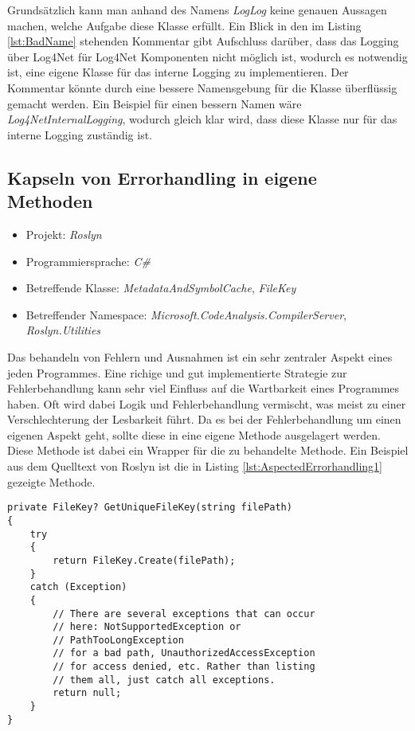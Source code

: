 \SuperPar Grundsätzlich kann man anhand des Namens \textit{LogLog} keine genauen Aussagen machen, welche Aufgabe diese Klasse erfüllt. Ein Blick in den im Listing \ref{lst:BadName} stehenden Kommentar gibt Aufschluss darüber, dass das Logging über Log4Net für Log4Net Komponenten nicht möglich ist, wodurch es notwendig ist, eine eigene Klasse für das interne Logging zu implementieren. Der Kommentar könnte durch eine bessere Namensgebung für die Klasse überflüssig gemacht werden. Ein Beispiel für einen bessern Namen wäre \textit{Log4NetInternalLogging}, wodurch gleich klar wird, dass diese Klasse nur für das interne Logging zuständig ist. 


\subsection{Kapseln von Errorhandling in eigene Methoden}
\begin{itemize}
	\item Projekt: \textit{Roslyn}
	\item Programmiersprache: \textit{C\#}
	\item Betreffende Klasse: \textit{MetadataAndSymbolCache}, \textit{FileKey}
	\item Betreffender Namespace: \textit{Microsoft.CodeAnalysis.CompilerServer}, \textit{Roslyn.Utilities}
\end{itemize}

\SuperPar Das behandeln von Fehlern und Ausnahmen ist ein sehr zentraler Aspekt eines jeden Programmes. Eine richige und gut implementierte Strategie zur Fehlerbehandlung kann sehr viel Einfluss auf die Wartbarkeit eines Programmes haben. Oft wird dabei Logik und Fehlerbehandlung vermischt, was meist zu einer Verschlechterung der Lesbarkeit führt. Da es bei der Fehlerbehandlung um einen eigenen Aspekt geht, sollte diese in eine eigene Methode ausgelagert werden. Diese Methode ist dabei ein Wrapper für die zu behandelte Methode. Ein Beispiel aus dem Quelltext von Roslyn ist die in Listing \ref{lst:AspectedErrorhandling1} gezeigte Methode.

\begin{lstlisting}[language={[Sharp]C}, caption=Beispiele für getrennten Aspket der Fehlerbehandlung, label=lst:AspectedErrorhandling1]
private FileKey? GetUniqueFileKey(string filePath)
{
	try
	{
		return FileKey.Create(filePath);
	}
	catch (Exception)
	{
		// There are several exceptions that can occur 
		// here: NotSupportedException or 
		// PathTooLongException
		// for a bad path, UnauthorizedAccessException 
		// for access denied, etc. Rather than listing
		// them all, just catch all exceptions.
		return null;
	}
}
\end{lstlisting}

